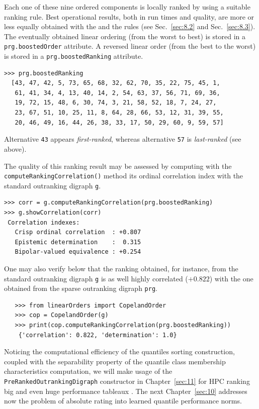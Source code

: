 Each one of these nine ordered components is locally ranked by using a suitable ranking rule. Best operational results, both in run times and quality, are more or less equally obtained with the \Copeland and the \NetFlows rules (see Sec.~\ref{sec:8.2} and Sec.~\ref{sec:8.3}). The eventually obtained linear ordering (from the worst to best) is stored in a \texttt{prg.boostedOrder} attribute. A reversed linear order (from the best to the worst) is stored in a \texttt{prg.boostedRanking} attribute.
  \begin{lstlisting}
>>> prg.boostedRanking
  [43, 47, 42, 5, 73, 65, 68, 32, 62, 70, 35, 22, 75, 45, 1,
   61, 41, 34, 4, 13, 40, 14, 2, 54, 63, 37, 56, 71, 69, 36,
   19, 72, 15, 48, 6, 30, 74, 3, 21, 58, 52, 18, 7, 24, 27,
   23, 67, 51, 10, 25, 11, 8, 64, 28, 66, 53, 12, 31, 39, 55,
   20, 46, 49, 16, 44, 26, 38, 33, 17, 50, 29, 60, 9, 59, 57]
\end{lstlisting}

Alternative \texttt{43} appears \emph{first-ranked}, whereas alternative \texttt{57} is \emph{last-ranked} (see above).

The quality of this ranking result may be assessed by computing with the \texttt{computeRankingCorrelation()} method its ordinal correlation index with the standard outranking digraph \texttt{g}.  
\begin{lstlisting}
>>> corr = g.computeRankingCorrelation(prg.boostedRanking)
>>> g.showCorrelation(corr)
 Correlation indexes:
   Crisp ordinal correlation  : +0.807
   Epistemic determination    :  0.315
   Bipolar-valued equivalence : +0.254
\end{lstlisting}

One may also verify below that the \Copeland ranking obtained, for instance, from the standard outranking digraph \texttt{g} is as well highly correlated ($+0.822$) with the one obtained from the sparse outranking digraph \texttt{prg}.
\begin{lstlisting}
   >>> from linearOrders import CopelandOrder
   >>> cop = CopelandOrder(g)
   >>> print(cop.computeRankingCorrelation(prg.boostedRanking))
    {'correlation': 0.822, 'determination': 1.0}
\end{lstlisting}

\vspace{\baselineskip}
Noticing the computational efficiency of the quantiles sorting construction, coupled with the separability property of the quantile class membership characteristics computation, we will make usage of the \texttt{PreRankedOutrankingDigraph} constructor in Chapter~\ref{sec:11} for HPC ranking big and even huge performance tableaux \citep{BIS-2016}. The next Chapter~\ref{sec:10} addresses now the problem of absolute rating into learned quantile performance norms.

%


 
